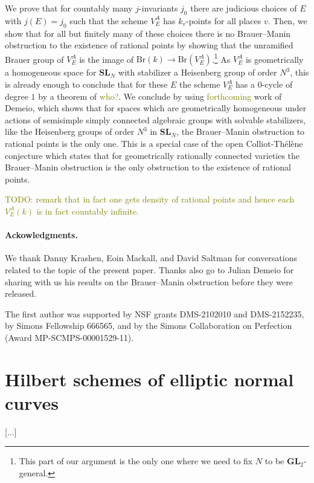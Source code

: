 \documentclass[10pt,letterpaper,twoside]{article}
\newcommand{\BA}[1]{\textcolor{olive}{#1}}
\renewcommand{\1}{\mathbf{1}}
\newcommand{\GL}{\mathbf{GL}}
\newcommand{\SL}{\mathbf{SL}}
\newcommand{\Br}{\mathrm{Br}}
\theoremstyle{plain}
\theoremstyle{plain}
\theoremstyle{definition}
\theoremstyle{named}
\theoremstyle{definition}
\begin{document}
We prove that for countably many $j$-invariants $j_0$ there are judicious choices of $E$ with
$j(E)=j_0$ such that the scheme $V_E^A$ has $k_v$-points for all places $v$. Then, we show that for
all but finitely many of these choices there is no Brauer--Manin obstruction to the existence of
rational points by showing that the unramified Brauer group of $V_E^A$ is the image
of $\Br(k)\rightarrow\Br(V_E^A)$.\footnote{This part of our argument is the only one where we need
to fix $N$ to be $\GL_2$-general.} As $V_E^A$ is geometrically a homogeneous space for $\SL_N$ with
stabilizer a Heisenberg group of order $N^3$, this is already enough to conclude that for these $E$ the scheme $V_E^A$ has a
$0$-cycle of degree $1$ by a theorem of \BA{who?}. We conclude by using \BA{forthcoming} work of Demeio,
which shows that for spaces which are geometrically homogeneous under actions of semisimple simply
connected algebraic groups with solvable stabilizers, like the Heisenberg groups of order $N^3$ in
$\SL_N$, the Brauer--Manin obstruction to rational points is the only one.
This is a special case of the open Colliot-Th\'el\`ene conjecture which states that for geometrically
rationally connected varieties the Brauer--Manin obstruction is the only obstruction to the
existence of rational points.

\BA{TODO: remark that in fact one gets density of rational points and hence each $V_E^A(k)$ is in
fact countably infinite.}



\paragraph{Ackowledgments.}
We thank Danny Krashen, Eoin Mackall, and David Saltman for conversations related to the topic of the
present paper. Thanks also go to Julian Demeio for sharing with us his results on the Brauer--Manin
obstruction before they were released.

The first author was supported by NSF grants DMS-2102010 and DMS-2152235, by Simons Fellowship
666565, and by the Simons Collaboration on Perfection (Award MP-SCMPS-00001529-11).





\section{Hilbert schemes of elliptic normal curves}


[...]
\end{document}
